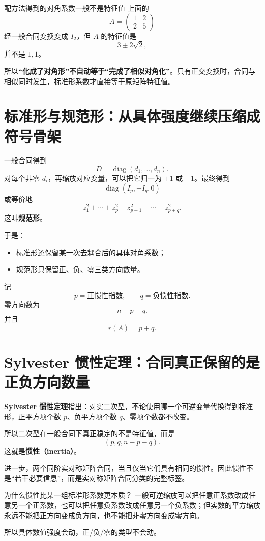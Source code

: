 \documentclass[11pt,a4paper]{ctexart}
\newcommand{\kw}[1]{\textbf{\color{deep}#1}}
\begin{document}
\begin{warnbox}{配方法得到的对角系数一般不是特征值}
上面的
\[
A=\begin{pmatrix}1&2\\2&5\end{pmatrix}
\]
经一般合同变换变成 $I_2$，但 $A$ 的特征值是
\[
3\pm2\sqrt2,
\]
并不是 $1,1$。

所以\kw{“化成了对角形”不自动等于“完成了相似对角化”}。只有正交变换时，合同与相似同时发生，标准形系数才直接等于原矩阵特征值。
\end{warnbox}

\section{标准形与规范形：从具体强度继续压缩成符号骨架}

一般合同得到
\[
D=\operatorname{diag}(d_1,\dots,d_n).
\]
对每个非零 $d_i$，再缩放对应变量，可以把它归一为 $+1$ 或 $-1$。最终得到
\[
\boxed{
\operatorname{diag}(I_p,-I_q,0)
}
\]
或等价地
\[
z_1^2+\cdots+z_p^2
-z_{p+1}^2-\cdots-z_{p+q}^2.
\]
这叫\kw{规范形}。

于是：
\begin{itemize}
  \item 标准形还保留某一次去耦合后的具体对角系数；
  \item 规范形只保留正、负、零三类方向数量。
\end{itemize}

记
\[
p=\text{正惯性指数},
\qquad
q=\text{负惯性指数}.
\]
零方向数为
\[
n-p-q.
\]
并且
\[
\boxed{r(A)=p+q.}
\]

\section{Sylvester 惯性定理：合同真正保留的是正负方向数量}

\kw{Sylvester 惯性定理}指出：对实二次型，不论使用哪一个可逆变量代换得到标准形，正平方项个数 $p$、负平方项个数 $q$、零项个数都不改变。

所以二次型在一般合同下真正稳定的不是特征值，而是
\[
\boxed{(p,q,n-p-q).}
\]
这就是\kw{惯性（inertia）}。

进一步，两个同阶实对称矩阵合同，当且仅当它们具有相同的惯性。因此惯性不是“若干必要信息”，而是实对称矩阵合同分类的完整标签。

\begin{methodbox}{为什么惯性比某一组标准形系数更本质？}
一般可逆缩放可以把任意正系数改成任意另一个正系数，也可以把任意负系数改成任意另一个负系数；但实数的平方缩放永远不能把正方向变成负方向，也不能把非零方向变成零方向。

所以具体数值强度会动，正/负/零的类型不会动。
\end{methodbox}
\end{document}
